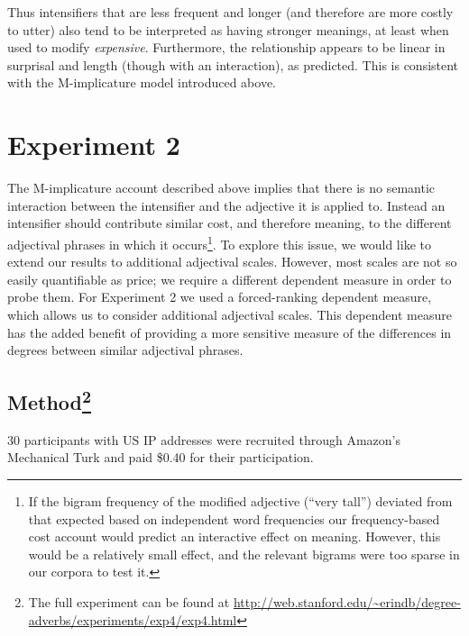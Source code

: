 \documentclass[10pt,letterpaper]{article}
\begin{document}
Thus intensifiers that are less frequent and longer (and therefore are more costly to utter) also tend to be interpreted as having stronger meanings, at least when used to modify \emph{expensive}. Furthermore, the relationship appears to be linear in surprisal and length (though with an interaction), as predicted.
This is consistent with the M-implicature model introduced above.

\section{Experiment 2}

The M-implicature account described above implies that there is no semantic interaction between the intensifier and the adjective it is applied to. Instead an intensifier should contribute similar cost, and therefore meaning, to the different adjectival phrases in which it occurs\footnote{If the bigram frequency of the modified adjective (``very tall'') deviated from that expected based on independent word frequencies our frequency-based cost account would predict an interactive effect on meaning. However, this would be a relatively small effect, and the relevant bigrams were too sparse in our corpora to test it.}.
To explore this issue, we would like to extend our results to additional adjectival scales. However, most scales are not so easily quantifiable as price; we require a different dependent measure in order to probe them.
For Experiment 2 we used a forced-ranking dependent measure, which allows us to consider additional adjectival scales. This dependent measure has the added benefit of providing a more sensitive measure of the differences in degrees between similar adjectival phrases.

\subsection{Method\footnote{The full experiment can be found at \url{http://web.stanford.edu/~erindb/degree-adverbs/experiments/exp4/exp4.html}}}

30 participants with US IP addresses were recruited through Amazon's Mechanical Turk and paid \$0.40 for their participation.
\end{document}
